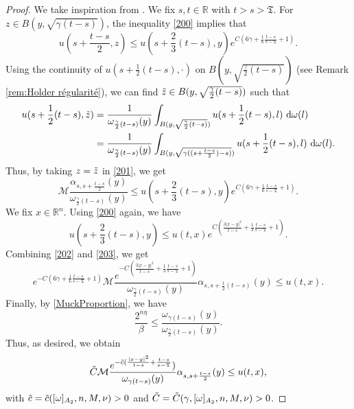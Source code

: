 \documentclass[12pt, letterpaper]{amsart}
\theoremstyle{definition}
\theoremstyle{remark}
\numberwithin{equation}{section}
\begin{document}
\begin{proof}
    We take inspiration from \cite[Theorem 7']{aronson1967local}. We fix $s,t \in \mathbb{R}$ with $t>s>\mathfrak{T}$. For $z \in B(y,\sqrt{\gamma(t-s)})$, the inequality \eqref{200} implies that 
    \begin{equation}\label{201}
        u(s+\frac{t-s}{2},z) \leq u(s+\frac{2}{3}(t-s),y) e^{C(6\gamma+\frac{1}{6}\frac{t-s}{s-\mathfrak{T}}+1)}.
    \end{equation}
    Using the continuity of $u(s+\frac{1}{2}(t-s),\cdot)$ on $B(y,\sqrt{\frac{\gamma}{2}(t-s)}  )$ (see Remark \ref{rem:Holder régularité}), we can find $\Tilde{z} \in B(y,\sqrt{\frac{\gamma}{2}(t-s)})$ such that 
    \begin{align*}
        u(s+\frac{1}{2}(t-s),\Tilde{z})&= \frac{1}{\omega_{\frac{\gamma}{2}(t-s)}(y)} \int_{B(y,\sqrt{\frac{\gamma}{2}(t-s)})} u(s+\frac{1}{2}(t-s),l) \ \mathrm{d}\omega(l)
        \\&= \frac{1}{\omega_{\frac{\gamma}{2}(t-s)}(y)} \int_{B(y,\sqrt{\gamma((s+\frac{t-s}{2})-s)})} u(s+\frac{1}{2}(t-s),l) \ \mathrm{d}\omega(l).
    \end{align*}
    Thus, by taking $z=\Tilde{z}$ in \eqref{201}, we get
    \begin{equation}\label{202}
       \mathcal{M} \frac{\alpha_{s,s+\frac{t-s}{2}}(y)}{\omega_{\frac{\gamma}{2}(t-s)}(y)} \leq u(s+\frac{2}{3}(t-s),y) e^{C(6\gamma+\frac{1}{6}\frac{t-s}{s-\mathfrak{T}}+1)}.
    \end{equation}
    We fix $x\in \mathbb{R}^n$. Using \eqref{200} again, we have 
    \begin{equation}\label{203}
        u(s+\frac{2}{3}(t-s),y) \leq u(t,x) e^{C(\frac{3|x-y|^2}{t-s}+\frac{1}{3}\frac{t-s}{s-\mathfrak{T}}+1)}.
    \end{equation}
    Combining \eqref{202} and \eqref{203}, we get $$ e^{-C(6\gamma+\frac{1}{6}\frac{t-s}{s-\mathfrak{T}}+1)} \mathcal{M} \frac{e^{-C(\frac{3|x-y|^2}{t-s}+\frac{1}{3}\frac{t-s}{s-\mathfrak{T}}+1)}}{\omega_{\frac{\gamma}{2}(t-s)}(y)} \alpha_{s,s+\frac{1}{2}(t-s)}(y) \leq u(t,x).$$
    Finally, by \eqref{MuckProportion}, we have $$ \frac{2^{n\eta}}{\beta} \leq \frac{\omega_{\gamma(t-s)}(y)}{\omega_{\frac{\gamma}{2}(t-s)}(y)}. $$
    Thus, as desired, we obtain $$\Tilde{C} \mathcal{M} \frac{e^{-\Tilde{c} (\frac{|x-y|^2}{t-s}+\frac{t-s}{s-\mathfrak{T}}})}{\omega_{\gamma(t-s)}(y)} \alpha_{s,s+\frac{t-s}{2}}(y) \leq u(t,x),$$
    with $\Tilde{c}=\Tilde{c}([ \omega  ]_{A_2},n,M,\nu)>0$ and $\Tilde{C}=\Tilde{C}(\gamma,[ \omega  ]_{A_2},n,M,\nu)>0$.
\end{proof}
\end{document}
